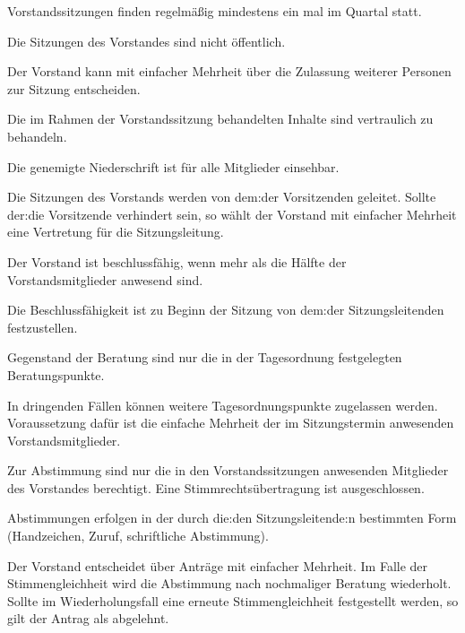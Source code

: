 \begin{gfvorstand}

  Vorstandssitzungen finden regelmäßig mindestens ein mal im Quartal statt.

  Die Sitzungen des Vorstandes sind nicht öffentlich.

  Der Vorstand kann mit einfacher Mehrheit über die Zulassung weiterer Personen zur Sitzung entscheiden.

  Die im Rahmen der Vorstandssitzung behandelten Inhalte sind vertraulich zu behandeln.

  Die genemigte Niederschrift ist für alle Mitglieder einsehbar.

  Die Sitzungen des Vorstands werden von dem:der Vorsitzenden geleitet. Sollte der:die Vorsitzende verhindert sein, so wählt der Vorstand mit einfacher Mehrheit eine Vertretung für die Sitzungsleitung.
  

  Der Vorstand ist beschlussfähig, wenn mehr als die Hälfte der Vorstandsmitglieder anwesend sind.

  Die Beschlussfähigkeit ist zu Beginn der Sitzung von dem:der Sitzungsleitenden festzustellen.


  Gegenstand der Beratung sind nur die in der Tagesordnung festgelegten Beratungspunkte.

  In dringenden Fällen können weitere Tagesordnungspunkte zugelassen werden. Voraussetzung dafür ist die einfache Mehrheit der im Sitzungstermin anwesenden Vorstandsmitglieder.


  Zur Abstimmung sind nur die in den Vorstandssitzungen anwesenden Mitglieder des Vorstandes berechtigt. Eine Stimmrechtsübertragung ist ausgeschlossen.

  Abstimmungen erfolgen in der durch die:den Sitzungsleitende:n bestimmten Form (Handzeichen, Zuruf, schriftliche Abstimmung).

  Der Vorstand entscheidet über Anträge mit einfacher Mehrheit. Im Falle der Stimmengleichheit wird die Abstimmung nach nochmaliger Beratung wiederholt. Sollte im Wiederholungsfall eine erneute Stimmengleichheit festgestellt werden, so gilt der Antrag als abgelehnt.



\end{gfvorstand}
